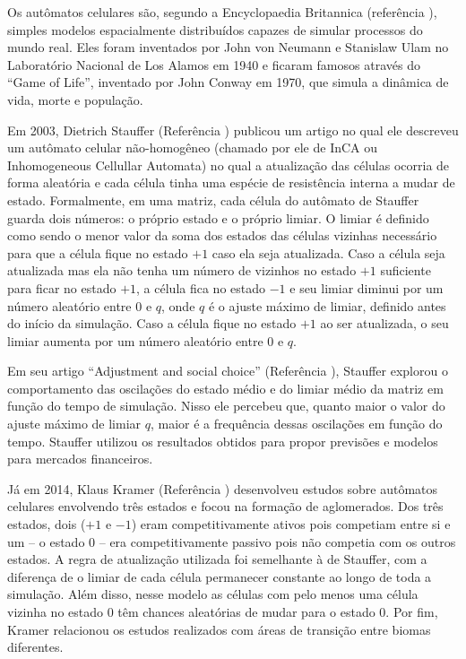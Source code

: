 \documentclass[
	12pt,				%
	openright,			%
	twoside,			%
	a4paper,			%
	english,			%
	french,				%
	spanish,			%
	brazil				%
	]{abntex2}
\begin{document}
Os autômatos celulares são, segundo a Encyclopaedia Britannica (referência \cite{britannica3}), simples modelos espacialmente distribuídos capazes de simular processos do mundo real. Eles foram inventados por John von Neumann e Stanislaw Ulam no Laboratório Nacional de Los Alamos em 1940 e ficaram famosos através do ``Game of Life'', inventado por John Conway em 1970, que simula a dinâmica de vida, morte e população.

Em 2003, Dietrich Stauffer (Referência \cite{stauffer}) publicou um artigo no qual ele descreveu um autômato celular não-homogêneo (chamado por ele de InCA ou Inhomogeneous Cellullar Automata) no qual a atualização das células ocorria de forma aleatória e cada célula tinha uma espécie de resistência interna a mudar de estado. Formalmente, em uma matriz, cada célula do autômato de Stauffer guarda dois números: o próprio estado e o próprio limiar. O limiar é definido como sendo o menor valor da soma dos estados das células vizinhas necessário para que a célula fique no estado $+1$ caso ela seja atualizada. Caso a célula seja atualizada mas ela não tenha um número de vizinhos no estado $+1$ suficiente para ficar no estado $+1$, a célula fica no estado $-1$ e seu limiar diminui por um número aleatório entre $0$ e $q$, onde $q$ é o ajuste máximo de limiar, definido antes do início da simulação. Caso a célula fique no estado $+1$ ao ser atualizada, o seu limiar aumenta por um número aleatório entre $0$ e $q$.

Em seu artigo ``Adjustment and social choice'' (Referência \cite{stauffer}), Stauffer explorou o comportamento das oscilações do estado médio e do limiar médio da matriz em função do tempo de simulação. Nisso ele percebeu que, quanto maior o valor do ajuste máximo de limiar $q$, maior é a frequência dessas oscilações em função do tempo. Stauffer utilizou os resultados obtidos para propor previsões e modelos para mercados financeiros.

Já em 2014, Klaus Kramer (Referência \cite{klaus}) desenvolveu estudos sobre autômatos celulares envolvendo três estados e focou na formação de aglomerados. Dos três estados, dois ($+1$ e $-1$) eram competitivamente ativos pois competiam entre si e um -- o estado $0$ -- era competitivamente passivo pois não competia com os outros estados. A regra de atualização utilizada foi semelhante à de Stauffer, com a diferença de o limiar de cada célula permanecer constante ao longo de toda a simulação. Além disso, nesse modelo as células com pelo menos uma célula vizinha no estado $0$ têm chances aleatórias de mudar para o estado $0$. Por fim, Kramer relacionou os estudos realizados com áreas de transição entre biomas diferentes.
\end{document}
